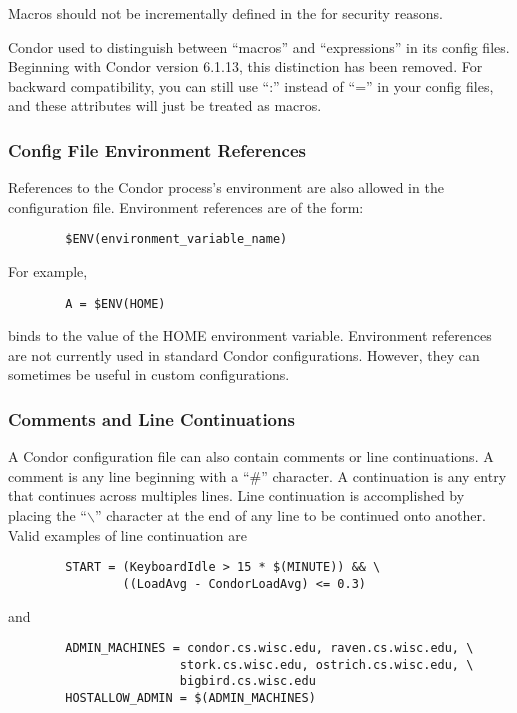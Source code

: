 \Note Macros should not be incrementally defined in the
 for security reasons.

\Note Condor used to distinguish between ``macros'' and ``expressions''
in its config files.
Beginning with Condor version 6.1.13, this distinction has been
removed.
For backward compatibility, you can still use ``:'' instead of ``=''
in your config files, and these attributes will just be treated as
macros.

\subsubsection{\label{sec:Config-File-Env}
Config File Environment References}

References to the Condor process's environment are also allowed in the
configuration file.
Environment references are of the form:
\begin{verbatim}
        $ENV(environment_variable_name)
\end{verbatim}
For example, 
\begin{verbatim}
        A = $ENV(HOME)
\end{verbatim}
binds  to the value of the HOME environment variable.
Environment references are not currently used in standard Condor
configurations.
However, they can sometimes be useful in custom configurations.

\subsubsection{\label{sec:Other-Syntax}
Comments and Line Continuations}

A Condor configuration file can also contain comments or
line continuations.
A comment is any line beginning with a ``\#'' character.
A continuation is any entry that continues across multiples lines.
Line continuation is accomplished by placing the ``$\backslash$''
character at the end of any line to be continued onto another.
Valid examples of line continuation are
\begin{verbatim}
        START = (KeyboardIdle > 15 * $(MINUTE)) && \
                ((LoadAvg - CondorLoadAvg) <= 0.3)
\end{verbatim}
and
\begin{verbatim}
        ADMIN_MACHINES = condor.cs.wisc.edu, raven.cs.wisc.edu, \
                        stork.cs.wisc.edu, ostrich.cs.wisc.edu, \
                        bigbird.cs.wisc.edu
        HOSTALLOW_ADMIN = $(ADMIN_MACHINES)
\end{verbatim}

